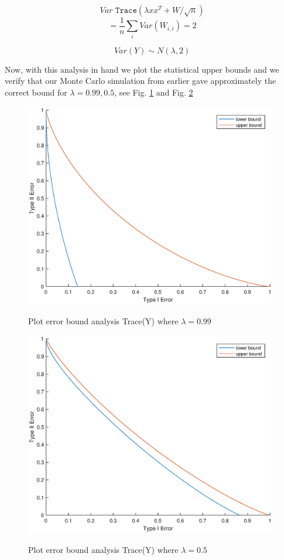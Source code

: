 \documentclass{article}
\begin{document}
$$ Var \texttt{ Trace}(\lambda x x^T + W/\sqrt{n}) $$
$$ = \frac {1}{n} \sum_i Var (W_{i,i}) = 2$$

$$ Var(Y) \sim N(\lambda,2) $$

Now, with this analysis in hand we plot the statistical upper bounds and we verify that our Monte Carlo simulation from earlier gave approximately the correct bound for $\lambda = 0.99, 0.5$, see Fig. \ref{fig:plot_traceY_lambda_99_analytic} and Fig. \ref{fig:plot_traceY_lambda_50_analytic}

\begin{figure}
    \centering
    {\includegraphics[width=11cm]{plot_traceY_lambda_99_analytic.eps} }
    \caption{ Plot error bound analysis Trace(Y) where $\lambda = 0.99$}
	\label{fig:plot_traceY_lambda_99_analytic}
\end{figure}

\begin{figure}
    \centering
    {\includegraphics[width=11cm]{plot_traceY_lambda_50_analytic.eps} }
    \caption{ Plot error bound analysis Trace(Y) where $\lambda = 0.5$}
	\label{fig:plot_traceY_lambda_50_analytic}
\end{figure}
\end{document}
